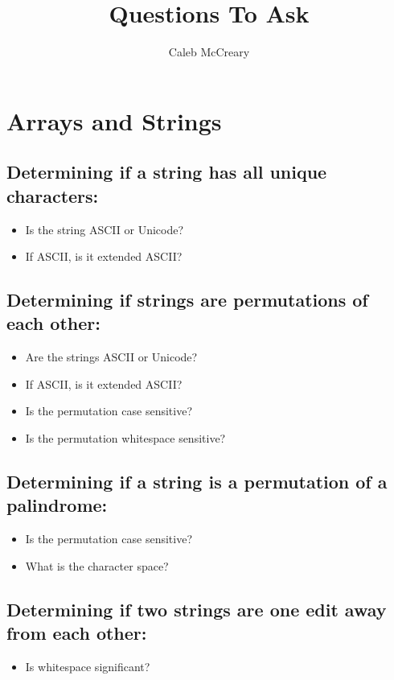 \documentclass{article}
\author{Caleb McCreary}
\date{}
\title{Questions To Ask}
\begin{document}
\maketitle
\section*{Arrays and Strings}
\subsection*{Determining if a string has all unique characters:}
\begin{itemize}
    \item Is the string ASCII or Unicode?
    \item If ASCII, is it extended ASCII?
\end{itemize}

\subsection*{Determining if strings are permutations of each other:}
\begin{itemize}
    \item Are the strings ASCII or Unicode?
    \item If ASCII, is it extended ASCII?
    \item Is the permutation case sensitive?
    \item Is the permutation whitespace sensitive?
\end{itemize}

\subsection*{Determining if a string is a permutation of a palindrome:}
\begin{itemize}
    \item Is the permutation case sensitive?
    \item What is the character space? 
\end{itemize}

\subsection*{Determining if two strings are one edit away from each other:}
\begin{itemize}
    \item Is whitespace significant?
\end{itemize}
\end{document}
